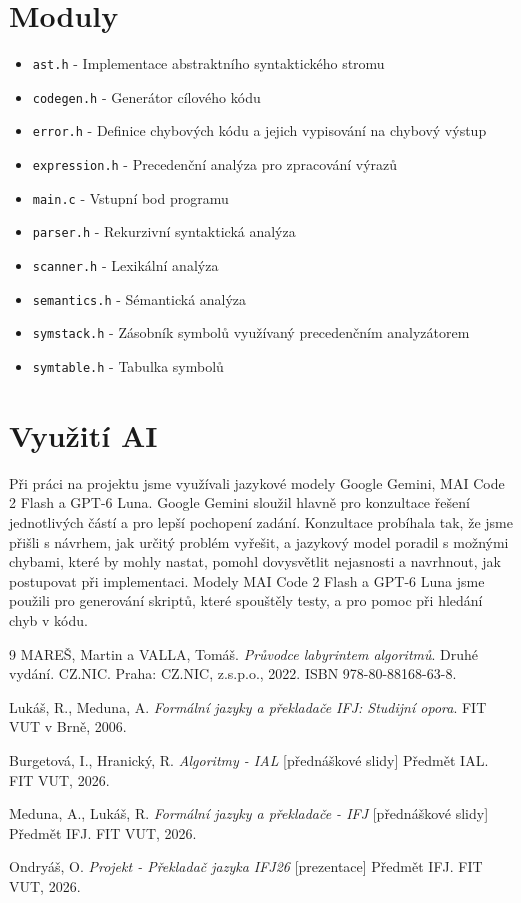 \documentclass[11pt]{article}
\begin{document}
\section{Moduly} {
  \begin{itemize}
	  \item \texttt{ast.h} - Implementace abstraktního syntaktického stromu
	  \item \texttt{codegen.h} - Generátor cílového kódu
	  \item \texttt{error.h} - Definice chybových kódu a jejich vypisování na chybový výstup
	  \item \texttt{expression.h} - Precedenční analýza pro zpracování výrazů
	  \item \texttt{main.c} - Vstupní bod programu
	  \item \texttt{parser.h} - Rekurzivní syntaktická analýza
	  \item \texttt{scanner.h} - Lexikální analýza
	  \item \texttt{semantics.h} - Sémantická analýza
	  \item \texttt{symstack.h} - Zásobník symbolů využívaný precedenčním analyzátorem
	  \item \texttt{symtable.h} - Tabulka symbolů
  \end{itemize}
 }

\section{Využití AI} {
  Při práci na projektu jsme využívali jazykové modely Google Gemini, MAI Code 2 Flash a GPT-6 Luna.
  Google Gemini sloužil hlavně pro konzultace řešení jednotlivých částí a pro lepší pochopení zadání.
  Konzultace probíhala tak, že jsme přišli s návrhem, jak určitý problém vyřešit, a jazykový model
  poradil s možnými chybami, které by mohly nastat, pomohl dovysvětlit nejasnosti a navrhnout, jak
  postupovat při implementaci. Modely MAI Code 2 Flash a GPT-6 Luna jsme použili pro generování skriptů,
  které spouštěly testy, a pro pomoc při hledání chyb v kódu.
 }

\renewcommand{\refname}{Zdroje}
\begin{thebibliography}{9}
	MAREŠ, Martin a VALLA, Tomáš.
	\textit{Průvodce labyrintem algoritmů}. Druhé vydání. CZ.NIC. Praha: CZ.NIC, z.s.p.o., 2022. ISBN 978-80-88168-63-8.

	Lukáš, R., Meduna, A.
	\textit{Formální jazyky a překladače IFJ: Studijní opora}. FIT VUT v Brně, 2006.

	Burgetová, I., Hranický, R.
	\textit{Algoritmy - IAL} [přednáškové slidy]
	Předmět IAL. FIT VUT, 2026.

	Meduna, A., Lukáš, R.
	\textit{Formální jazyky a překladače - IFJ} [přednáškové slidy]
	Předmět IFJ. FIT VUT, 2026.

	Ondryáš, O.
	\textit{Projekt - Překladač jazyka IFJ26} [prezentace]
	Předmět IFJ. FIT VUT, 2026.
\end{thebibliography}
\end{document}
